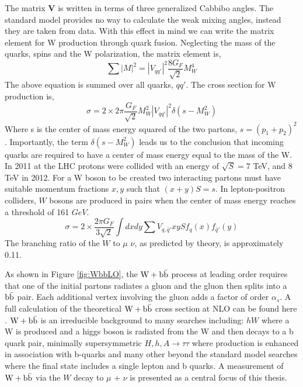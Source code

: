 The matrix {\bf V} is written in terms of three generalized Cabbibo angles.
The standard model provides no way to calculate the weak mixing angles, instead they
are taken from data.
With this effect in mind we can write the matrix element for W production through quark fusion.
Neglecting the mass of the quarks, spins and the W polarization, the matrix element is,
\begin{equation}
\sum|M|^{2}=|V_{qq'}|^{2}\frac{8G_{F}}{\sqrt{2}}M_{W}^{4}
\end{equation}
The above equation is summed over all quarks, $qq'$. The cross section for W production is,
\begin{equation}
\sigma=2\times2\pi\frac{G_{F}}{\sqrt{2}}M_{W}^{2}|V_{qq'}|^{2}\delta(s-M_{W}^{2})
\end{equation}
Where s is the center of mass energy squared of the two partons, $s=(p_{1}+p_{2})^{2}$.
Importantly, the term $\delta(s-M_{W}^{2})$ leads us to the 
conclusion that incoming quarks are required to have a center of mass energy
equal to the mass of the W. 
In 2011 at the LHC protons were collided with an energy of $\sqrt{S}=7$ TeV, and 8 TeV in 2012.
For a W boson to be created two interacting partons must have suitable
momentum fractions $x, y$ such that $(x+y)S=s$.
In lepton-positron colliders, $W$ bosons are produced in pairs when 
the center of mass energy reaches a threshold of 161 $GeV$. 
\begin{equation}
\sigma=2\times\frac{2\pi G_{F}}{3\sqrt{2}}\int{dxdy \sum{V_{q,\bar{q}'}}xyS f_{q}(x)f_{\bar{q}'}(y)}
\end{equation}
The branching ratio of the $W$ to $\mu$ $\nu$, as predicted by theory, is approximately 0.11. 

As shown in Figure \ref{fig:WbbLO}, the $\mathrm{W+\mathrm{b\bar{b}}}$ process at leading order requires that one of the initial partons
radiates a gluon and the gluon then splits into a $\mathrm{b\bar{b}}$ pair. Each additional
vertex involving the gluon adds a factor of order $\alpha_{s}$. A full
calculation of the theoretical $\mathrm{W+\mathrm{b\bar{b}}}$ cross section at NLO can be found here \cite{Campbell:2010ff, Badger:2010mg}.
$\mathrm{W+\mathrm{b\bar{b}}}$ is an irreducible background to many searches including:
$hW$ where a W is produced and a higgs boson is radiated from the W
and then decays to a b quark pair, minimally supersymmetric $H,h,A\rightarrow \tau\tau$
where production is enhanced in association with b-quarks and many other beyond the standard
model searches where the final state includes a single lepton and b quarks. 
A measurement of $\mathrm{W+\mathrm{b\bar{b}}}$ via the $W$ decay to $\mu$ + $\nu$ is presented as a 
central focus of this thesis.

